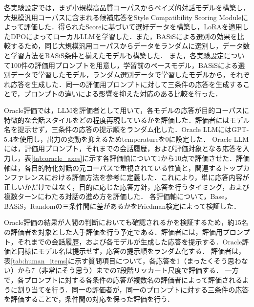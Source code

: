 \documentclass[manuscript,review,anonymous]{acmart}
\begin{document}
各実験設定では，まず小規模高品質コーパスからベイズ的対話モデルを構築し，大規模汎用コーパスに含まれる候補応答をStyle Compatibility Scoring Moduleによって評価した．得られたScoreに基づいて選好データを構築し，LoRAを適用したDPOによってローカルLLMを学習した．また，BASiSによる選別の効果を比較するため，同じ大規模汎用コーパスからデータをランダムに選別し，データ数と学習方法をBASiS条件と揃えたモデルも構築した．
また，各実験設定について100件の評価用プロンプトを用意し，学習前のベースモデル，BASiSによる選別データで学習したモデル，ランダム選別データで学習したモデルから，それぞれ応答を生成した．同一の評価用プロンプトに対して三条件の応答を生成することで，プロンプトの違いによる影響を抑えた対応のある比較を行った．

Oracle評価では，LLMを評価者として用いて，各モデルの応答が目的コーパスに特徴的な会話スタイルをどの程度再現しているかを評価した．評価者にはモデル名を提示せず，三条件の応答の提示順をランダム化した．Oracle LLMにはGPT-5.4を使用し，出力の変動を抑えるためtemperatureを0に設定した．
Oracle LLMには，評価用プロンプト，それまでの会話履歴，および評価対象となる応答を入力し，表\ref{tab:oracle_axes}に示す各評価軸について1から10点で評価させた．評価軸は，各目的特化対話の元コーパスで重視されている性質と，関連するトップカンファレンスにおける評価方法を参考に定義した．これにより，単に応答内容が正しいかだけではなく，目的に応じた応答方針，応答を行うタイミング，および複数ターンにわたる対話の進め方を評価した．
各評価軸について，Base，BASiS，Randomの三条件間に差があるかをFriedman検定によって検証した．

Oracle評価の結果が人間の判断においても確認されるかを検証するため，約15名の評価者を対象とした人手評価を行う予定である．評価者には，評価用プロンプト，それまでの会話履歴，および各モデルが生成した応答を提示する．Oracle評価と同様にモデル名は提示せず，応答の提示順をランダム化する．
評価者は，表\ref{tab:human_items}に示す質問項目について，各応答を1（まったくそう思わない）から7（非常にそう思う）までの7段階リッカート尺度で評価する．
一方で，各プロンプトに対する各条件の応答が複数名の評価者によって評価されるように割り当てを行う．同一の評価者が，同一のプロンプトに対する三条件の応答を評価することで，条件間の対応を保った評価を行う．
\end{document}
